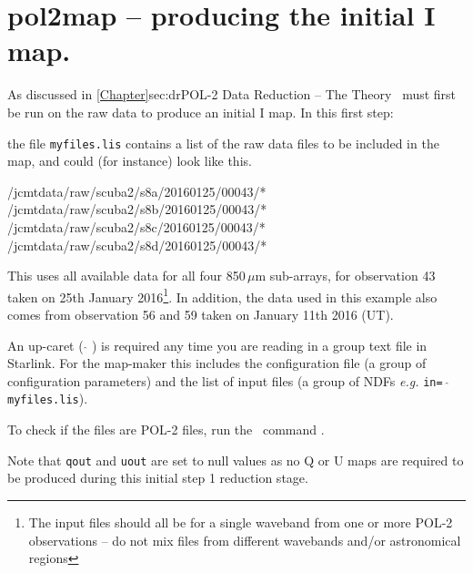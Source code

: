 \section{pol2map -- producing the initial I map.}
\label{sec:how-step1}

As discussed in \cref{Chapter}{sec:dr}{POL-2 Data Reduction -- The
  Theory} \poltwomap\ must first be run on the raw data to produce an
initial I map.  In this first step:

\begin{terminalv}
\end{terminalv}

the file \texttt{myfiles.lis} contains a list of the raw data
files to be included in the map, and could (for instance) look like
this.

\begin{terminalv}
/jcmtdata/raw/scuba2/s8a/20160125/00043/*
/jcmtdata/raw/scuba2/s8b/20160125/00043/*
/jcmtdata/raw/scuba2/s8c/20160125/00043/*
/jcmtdata/raw/scuba2/s8d/20160125/00043/*
\end{terminalv}

This uses all available data for all four 850\,$\mu$m sub-arrays, for
observation 43 taken on 25th January 2016\footnote{The input files
  should all be for a single waveband from one or more POL-2
  observations -- do not mix files from different wavebands and/or
  astronomical regions}. In addition, the data used in this example
also comes from observation 56 and 59 taken on January 11th 2016 (UT).

\begin{tip}
  An up-caret ( $ \hat{} $ ) is required any time you are reading in a
  group text file in Starlink. For the map-maker this includes the
  configuration file (a group of configuration parameters) and the
  list of input files (a group of NDFs \emph{e.g.} \texttt{in= $
    \hat{} $ myfiles.lis}).

  To check if the files are POL-2 files, run the \smurf\ command
  .
\begin{terminalv}
\end{terminalv}
\end{tip}

Note that \texttt{qout} and \texttt{uout} are set to null values as no
Q or U maps are required to be produced during this initial step 1
reduction stage.

